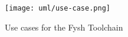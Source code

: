 \begin{figure}[h]
	\centering
	\texttt{[image: uml/use-case.png]}
	\caption{Use cases for the Fysh Toolchain}
	\label{fig:use-case}
\end{figure}

